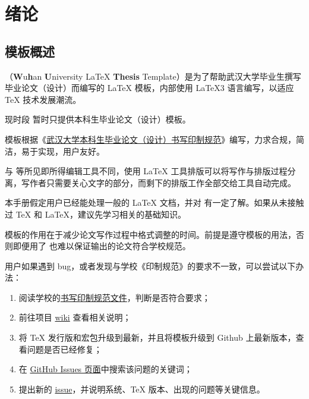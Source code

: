 
\chapter{绪论}
\section{模板概述}
\WhuThesis（\textbf{W}u\textbf{h}an \textbf{U}niversity \LaTeX{} \textbf{Thesis} Template）是为了帮助武汉大学毕业生撰写毕业论文（设计）而编写的 \LaTeX{} 模板，内部使用 \LaTeX3 语言编写，以适应 \TeX{} 技术发展潮流。

现时段 \WhuThesis 暂时只提供本科生毕业论文（设计）模板。

模板根据《\href{https://github.com/mtobeiyf/whu-thesis/files/4638713/default.pdf}{武汉大学本科生毕业论文（设计）书写印制规范}》编写，力求合规，简洁，易于实现，用户友好。

与  等所见即所得编辑工具不同，使用 \LaTeX{} 工具排版可以将写作与排版过程分离，写作者只需要关心文字的部分，而剩下的排版工作全部交给工具自动完成。

本手册假定用户已经能处理一般的 \LaTeX{} 文档，并对  有一定了解。如果从未接触过 \TeX{} 和 \LaTeX{}，建议先学习相关的基础知识。

\begin{notice}
    模板的作用在于减少论文写作过程中格式调整的时间。前提是遵守模板的用法，否则即便用了 \WhuThesis 也难以保证输出的论文符合学校规范。
\end{notice}

用户如果遇到 bug，或者发现与学校《印制规范》的要求不一致，可以尝试以下办法：
\begin{enumerate}
    \item 阅读学校的\href{https://github.com/mtobeiyf/whu-thesis/files/4638713/default.pdf}{书写印制规范文件}，判断是否符合要求；
    \item 前往项目 \href{https://github.com/mtobeiyf/whu-thesis/wiki}{wiki} 查看相关说明；
    \item 将 \TeX{} 发行版和宏包升级到最新，并且将模板升级到 Github 上最新版本，查看问题是否已经修复；
    \item 在 \href{https://github.com/mtobeiyf/whu-thesis/issues}{GitHub Issues 页面}中搜索该问题的关键词；
    \item 提出新的 \href{https://github.com/mtobeiyf/whu-thesis/issues}{issue}，并说明系统、\TeX{} 版本、出现的问题等关键信息。
\end{enumerate}

